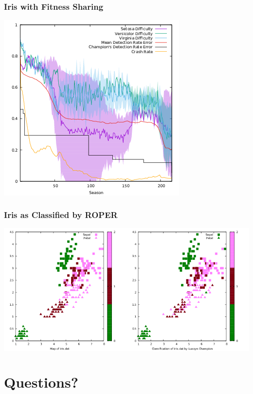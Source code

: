 \documentclass[11pt]{article}
\begin{document}
\subsubsection*{Iris with Fitness Sharing}
\label{sec:org2160a44}
\begin{center}
\includegraphics[width=.9\linewidth]{./img/sharing.png}
\end{center}

\subsubsection*{Iris as Classified by ROPER}
\label{sec:orgfb5fa40}
\begin{center}
\includegraphics[width=.9\linewidth]{./img/iris_with_luxxyn.png}
\end{center}

\section*{Questions?}
\label{sec:orgbc98356}
\end{document}

